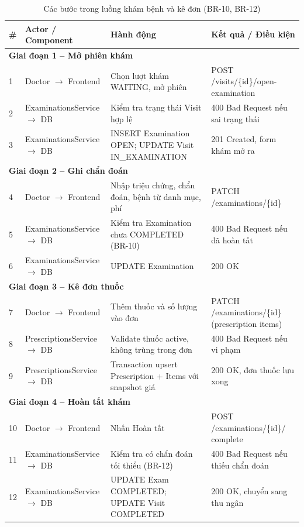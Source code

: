 \begin{longtable}{|p{0.5cm}|p{4cm}|p{5cm}|p{4.2cm}|}
\caption{Các bước trong luồng khám bệnh và kê đơn (BR-10, BR-12)}\label{tab:examination-sequence}\\
\hline
\textbf{\#} & \textbf{Actor / Component} & \textbf{Hành động} & \textbf{Kết quả / Điều kiện} \\
\hline
\multicolumn{4}{|l|}{\textbf{Giai đoạn 1 -- Mở phiên khám}} \\
\hline
1 & Doctor $\rightarrow$ Frontend & Chọn lượt khám WAITING, mở phiên & POST /visits/\{id\}/open-examination \\
\hline
2 & ExaminationsService $\rightarrow$ DB & Kiểm tra trạng thái Visit hợp lệ & 400 Bad Request nếu sai trạng thái \\
\hline
3 & ExaminationsService $\rightarrow$ DB & INSERT Examination OPEN; UPDATE Visit IN\_EXAMINATION & 201 Created, form khám mở ra \\
\hline
\multicolumn{4}{|l|}{\textbf{Giai đoạn 2 -- Ghi chẩn đoán}} \\
\hline
4 & Doctor $\rightarrow$ Frontend & Nhập triệu chứng, chẩn đoán, bệnh từ danh mục, phí & PATCH /examinations/\{id\} \\
\hline
5 & ExaminationsService $\rightarrow$ DB & Kiểm tra Examination chưa COMPLETED (BR-10) & 400 Bad Request nếu đã hoàn tất \\
\hline
6 & ExaminationsService $\rightarrow$ DB & UPDATE Examination & 200 OK \\
\hline
\multicolumn{4}{|l|}{\textbf{Giai đoạn 3 -- Kê đơn thuốc}} \\
\hline
7 & Doctor $\rightarrow$ Frontend & Thêm thuốc và số lượng vào đơn & PATCH /examinations/\{id\} (prescription items) \\
\hline
8 & PrescriptionsService $\rightarrow$ DB & Validate thuốc active, không trùng trong đơn & 400 Bad Request nếu vi phạm \\
\hline
9 & PrescriptionsService $\rightarrow$ DB & Transaction upsert Prescription + Items với snapshot giá & 200 OK, đơn thuốc lưu xong \\
\hline
\multicolumn{4}{|l|}{\textbf{Giai đoạn 4 -- Hoàn tất khám}} \\
\hline
10 & Doctor $\rightarrow$ Frontend & Nhấn Hoàn tất & POST /examinations/\{id\}/ complete \\
\hline
11 & ExaminationsService $\rightarrow$ DB & Kiểm tra có chẩn đoán tối thiểu (BR-12) & 400 Bad Request nếu thiếu chẩn đoán \\
\hline
12 & ExaminationsService $\rightarrow$ DB & UPDATE Exam COMPLETED; UPDATE Visit COMPLETED & 200 OK, chuyển sang thu ngân \\
\hline
\end{longtable}

